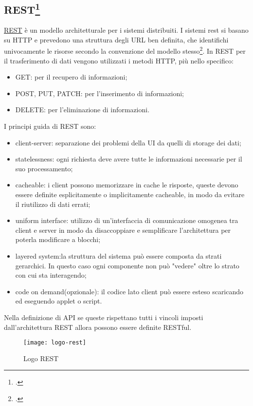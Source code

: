 \subsection{REST\footcite{REST: acronimo di Representational State Transfer}}
\href{https://restfulapi.net/}{REST} è un modello architetturale per i sistemi distribuiti. I sistemi rest si basano su HTTP e prevedono una struttura degli URL ben definita, che identifichi univocamente le risorse secondo la convenzione del modello stesso\footcite{Resource Naming: https://restfulapi.net/resource-naming/}. 
In REST per il trasferimento di dati vengono utilizzati i metodi HTTP, più nello specifico:
\begin{itemize}
    \item GET: per il recupero di informazioni;
    \item POST, PUT, PATCH: per l'inserimento di informazioni;
    \item DELETE: per l'eliminazione di informazioni.
\end{itemize}
I principi guida di REST sono:
\begin{itemize}
    \item client-server: separazione dei problemi della UI da quelli di storage dei dati;
    \item statelessness: ogni richiesta deve avere tutte le informazioni necessarie per il suo processamento;
    \item cacheable: i client possono memorizzare in cache le risposte, queste devono essere definite esplicitamente o implicitamente cacheable, in modo da evitare il riutilizzo di dati errati;
    \item uniform interface: utilizzo di un'interfaccia di comunicazione omogenea tra client e server in modo da disaccoppiare e semplificare l'architettura per poterla modificare a blocchi;
    \item layered system:la struttura del sistema può essere composta da strati gerarchici. In questo caso ogni componente non può "vedere" oltre lo strato con cui sta interagendo;
    \item code on demand(opzionale): il codice lato client può essere esteso scaricando ed eseguendo applet o script.
\end{itemize}
Nella definizione di API se queste rispettano tutti i vincoli imposti dall'architettura REST allora possono essere definite RESTful.
\begin{figure}[h]
    \begin{center}
    \texttt{[image: logo-rest]}
    \caption{Logo REST}
    \label{fig:figure6}
    \end{center}
\end{figure}


